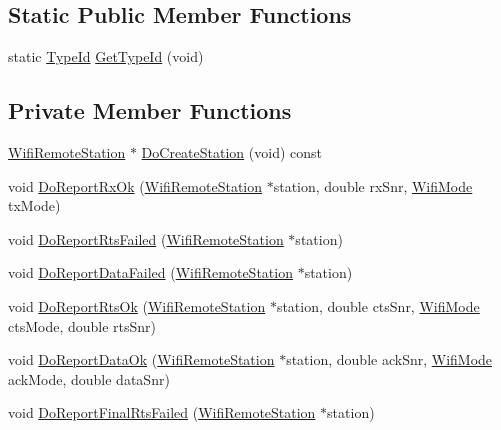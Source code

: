\subsection*{Static Public Member Functions}
\begin{DoxyCompactItemize}
\item 
static \hyperlink{classns3_1_1TypeId}{Type\+Id} \hyperlink{classns3_1_1AparfWifiManager_abadf33c801b4ef6667e7ca710dd9fd7f}{Get\+Type\+Id} (void)
\end{DoxyCompactItemize}
\subsection*{Private Member Functions}
\begin{DoxyCompactItemize}
\item 
\hyperlink{structns3_1_1WifiRemoteStation}{Wifi\+Remote\+Station} $\ast$ \hyperlink{classns3_1_1AparfWifiManager_a24cbd61093179bba65baaf3a8ab1a226}{Do\+Create\+Station} (void) const 
\item 
void \hyperlink{classns3_1_1AparfWifiManager_a01464d638beef7e6a84dad58b9922d67}{Do\+Report\+Rx\+Ok} (\hyperlink{structns3_1_1WifiRemoteStation}{Wifi\+Remote\+Station} $\ast$station, double rx\+Snr, \hyperlink{classns3_1_1WifiMode}{Wifi\+Mode} tx\+Mode)
\item 
void \hyperlink{classns3_1_1AparfWifiManager_a2d758ed935c131422bbffe9443d5a4c2}{Do\+Report\+Rts\+Failed} (\hyperlink{structns3_1_1WifiRemoteStation}{Wifi\+Remote\+Station} $\ast$station)
\item 
void \hyperlink{classns3_1_1AparfWifiManager_a3a4301f367370f1ac76e586104408fc4}{Do\+Report\+Data\+Failed} (\hyperlink{structns3_1_1WifiRemoteStation}{Wifi\+Remote\+Station} $\ast$station)
\item 
void \hyperlink{classns3_1_1AparfWifiManager_a9fc413e8ba0df4bbd986434cf58f3311}{Do\+Report\+Rts\+Ok} (\hyperlink{structns3_1_1WifiRemoteStation}{Wifi\+Remote\+Station} $\ast$station, double cts\+Snr, \hyperlink{classns3_1_1WifiMode}{Wifi\+Mode} cts\+Mode, double rts\+Snr)
\item 
void \hyperlink{classns3_1_1AparfWifiManager_aebf937503ecf5b198c0c42de0d435574}{Do\+Report\+Data\+Ok} (\hyperlink{structns3_1_1WifiRemoteStation}{Wifi\+Remote\+Station} $\ast$station, double ack\+Snr, \hyperlink{classns3_1_1WifiMode}{Wifi\+Mode} ack\+Mode, double data\+Snr)
\item 
void \hyperlink{classns3_1_1AparfWifiManager_a9dda711eba272c1f11c882c26c53b64a}{Do\+Report\+Final\+Rts\+Failed} (\hyperlink{structns3_1_1WifiRemoteStation}{Wifi\+Remote\+Station} $\ast$station)

\end{DoxyCompactItemize}
